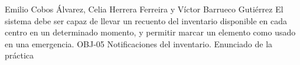 {Emilio Cobos Álvarez, Celia Herrera Ferreira y Víctor Barrueco Gutiérrez}
{El sistema debe ser capaz de llevar un recuento del inventario disponible en cada centro en un determinado momento, y permitir marcar un elemento como usado en una emergencia.}
{OBJ-05 Notificaciones del inventario.}
{Enunciado de la práctica}

